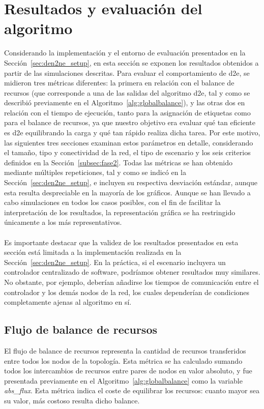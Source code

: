 \section{Resultados y evaluación del algoritmo}

Considerando la implementación y el entorno de evaluación presentados en la Sección~\ref{sec:den2ne_setup}, en esta sección se exponen los resultados obtenidos a partir de las simulaciones descritas. Para evaluar el comportamiento de \gls{d2e}, se midieron tres métricas diferentes: la primera en relación con el balance de recursos (que corresponde a una de las salidas del algoritmo \gls{d2e}, tal y como se describió previamente en el Algoritmo~\ref{alg:globalbalance}), y las otras dos en relación con el tiempo de ejecución, tanto para la asignación de etiquetas como para el balance de recursos, ya que nuestro objetivo era evaluar qué tan eficiente es \gls{d2e} equilibrando la carga y qué tan rápido realiza dicha tarea. Por este motivo, las siguientes tres secciones examinan estos parámetros en detalle, considerando el tamaño, tipo y conectividad de la red, el tipo de escenario y los seis criterios definidos en la Sección~\ref{subsec:fase2}. Todas las métricas se han obtenido mediante múltiples repeticiones, tal y como se indicó en la Sección~\ref{sec:den2ne_setup}, e incluyen su respectiva desviación estándar, aunque esta resulta despreciable en la mayoría de los gráficos. Aunque se han llevado a cabo simulaciones en todos los casos posibles, con el fin de facilitar la interpretación de los resultados, la representación gráfica se ha restringido únicamente a los más representativos.\\
\\
Es importante destacar que la validez de los resultados presentados en esta sección está limitada a la implementación realizada en la Sección~\ref{sec:den2ne_setup}. En la práctica, si el escenario incluyera un controlador centralizado de software, podríamos obtener resultados muy similares. No obstante, por ejemplo, deberían añadirse los tiempos de comunicación entre el controlador y los demás nodos de la red, los cuales dependerían de condiciones completamente ajenas al algoritmo en sí.

\subsection{Flujo de balance de recursos} 

El flujo de balance de recursos representa la cantidad de recursos transferidos entre todos los nodos de la topología. Esta métrica se ha calculado sumando todos los intercambios de recursos entre pares de nodos en valor absoluto, y fue presentada previamente en el Algoritmo~\ref{alg:globalbalance} como la variable \textit{abs\_flux}. Esta métrica indica el coste de equilibrar los recursos: cuanto mayor sea su valor, más costoso resulta dicho balance.\\


